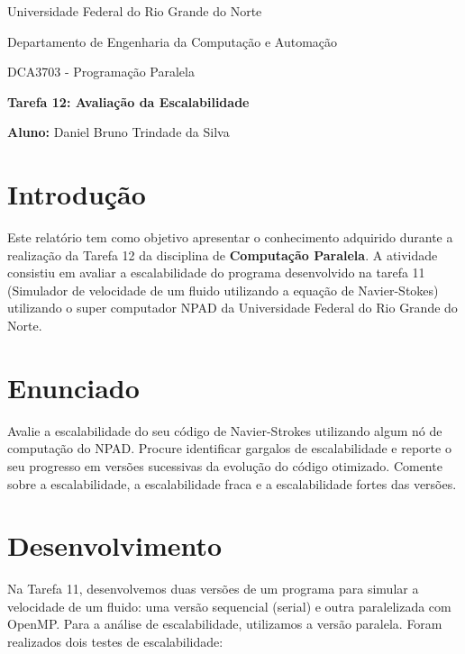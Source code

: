 \documentclass[a4paper, 12pt]{article}
\begin{document}
	\begin{center}
		Universidade Federal do Rio Grande do Norte
		
		Departamento de Engenharia da Computação e Automação  
		
		DCA3703 - Programação Paralela  
		
		\textbf{Tarefa 12: Avaliação da Escalabilidade}  
		
		\textbf{Aluno:} Daniel Bruno Trindade da Silva  
	\end{center}  
	
	\section{Introdução}  
	\hspace{.62cm}Este relatório tem como objetivo apresentar o conhecimento adquirido durante a realização da Tarefa 12 da disciplina de \textbf{Computação Paralela}. A atividade consistiu em avaliar a escalabilidade do programa desenvolvido na tarefa 11 (Simulador de velocidade de um fluido utilizando a equação de Navier-Stokes) utilizando o super computador NPAD da Universidade Federal do Rio Grande do Norte.  
	
	\section{Enunciado}    
	\hspace{.62cm} Avalie a escalabilidade do seu código de Navier-Strokes utilizando algum nó de computação do NPAD. Procure identificar gargalos de escalabilidade e reporte o seu progresso em versões sucessivas da evolução do código otimizado. Comente sobre a escalabilidade, a escalabilidade fraca e a escalabilidade fortes das versões.  
	
	\section{Desenvolvimento}
	\hspace{.62cm}Na Tarefa 11, desenvolvemos duas versões de um programa para simular a velocidade de um fluido: uma versão sequencial (serial) e outra paralelizada com OpenMP. Para a análise de escalabilidade, utilizamos a versão paralela. Foram realizados dois testes de escalabilidade:
	
\end{document}

